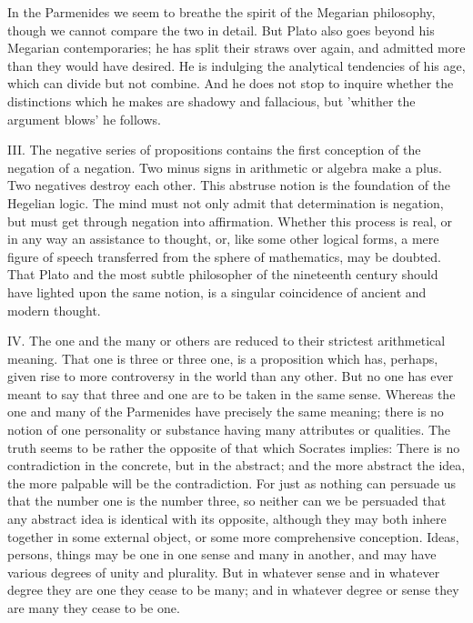 \documentclass[11pt,letter]{article}
\begin{document}
\par  In the Parmenides we seem to breathe the spirit of the Megarian philosophy, though we cannot compare the two in detail. But Plato also goes beyond his Megarian contemporaries; he has split their straws over again, and admitted more than they would have desired. He is indulging the analytical tendencies of his age, which can divide but not combine. And he does not stop to inquire whether the distinctions which he makes are shadowy and fallacious, but 'whither the argument blows' he follows.

\par  III. The negative series of propositions contains the first conception of the negation of a negation. Two minus signs in arithmetic or algebra make a plus. Two negatives destroy each other. This abstruse notion is the foundation of the Hegelian logic. The mind must not only admit that determination is negation, but must get through negation into affirmation. Whether this process is real, or in any way an assistance to thought, or, like some other logical forms, a mere figure of speech transferred from the sphere of mathematics, may be doubted. That Plato and the most subtle philosopher of the nineteenth century should have lighted upon the same notion, is a singular coincidence of ancient and modern thought.

\par  IV. The one and the many or others are reduced to their strictest arithmetical meaning. That one is three or three one, is a proposition which has, perhaps, given rise to more controversy in the world than any other. But no one has ever meant to say that three and one are to be taken in the same sense. Whereas the one and many of the Parmenides have precisely the same meaning; there is no notion of one personality or substance having many attributes or qualities. The truth seems to be rather the opposite of that which Socrates implies: There is no contradiction in the concrete, but in the abstract; and the more abstract the idea, the more palpable will be the contradiction. For just as nothing can persuade us that the number one is the number three, so neither can we be persuaded that any abstract idea is identical with its opposite, although they may both inhere together in some external object, or some more comprehensive conception. Ideas, persons, things may be one in one sense and many in another, and may have various degrees of unity and plurality. But in whatever sense and in whatever degree they are one they cease to be many; and in whatever degree or sense they are many they cease to be one.
\end{document}
